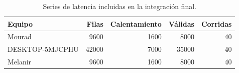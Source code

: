 \begin{table}[htbp]\centering\small
\caption{Series de latencia incluidas en la integración final.}
\begin{tabular}{lrrrr}
\toprule
Equipo & Filas & Calentamiento & Válidas & Corridas \\
\midrule
Mourad & 9600 & 1600 & 8000 & 40 \\
DESKTOP-5MJCPHU & 42000 & 7000 & 35000 & 40 \\
Melanir & 9600 & 1600 & 8000 & 40 \\
\bottomrule
\end{tabular}
\end{table}
